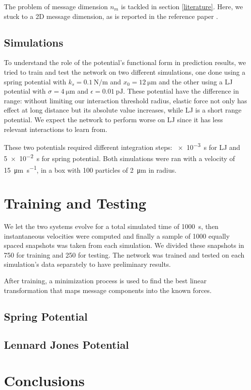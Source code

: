 \documentclass[../../master_thesis_np.tex]{subfiles}
\begin{document}
The problem of message dimension $n_m$ is tackled in section \ref{literature}. 
Here, we stuck to a 2D message dimension, as is reported in the reference paper \cite{ruiz-garcia_discovering_2024}.

\subsection{Simulations}
To understand the role of the potential's functional form in prediction results, we tried to train and test the network on two different simulations, one done using a spring potential with $k_s = \SI{0.1}{\newton\per\meter}$ and $x_0 = \SI{12}{\um}$ and the other using a LJ potential with $\sigma = \SI{4}{\um}$ and $\epsilon = \SI{0.01}{\pico\joule}$.
These potential have the difference in range: without limiting our interaction threshold radius, elastic force not only has effect at long distance but its absolute value increases, while LJ is a short range potential.
We expect the network to perform worse on LJ since it has less relevant interactions to learn from.

These two potentials required different integration steps: \SI{e-3}{\second} for LJ and \SI{5e-2}{\second} for spring potential.
Both simulations were ran with a velocity of \SI{15}{\um \per \second}, in a  box with \num{100} particles of \SI{2}{\um} in radius.

\section{Training and Testing}

We let the two systems evolve for a total simulated time of \SI{1000}{\second}, then instantaneous velocities were computed and finally a sample of \num{1000} equally spaced snapshots was taken from each simulation.
We divided these snapshots in \num{750} for training and \num{250} for testing.
The network was trained and tested on each simulation's data separately to have preliminary results.

After training, a minimization process is used to find the best linear transformation that maps message components into the known forces.

\subsection{Spring Potential}
\subsection{Lennard Jones Potential}
\section{Conclusions}
\end{document}

